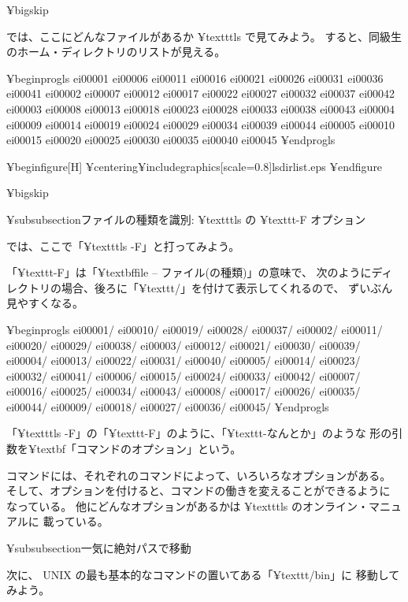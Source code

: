 {¥bigskip

では、ここにどんなファイルがあるか ¥texttt{ls} で見てみよう。
すると、同級生のホーム・ディレクトリのリストが見える。

¥begin{progls}
ei00001 ei00006 ei00011 ei00016 ei00021 ei00026 ei00031 ei00036 ei00041
ei00002 ei00007 ei00012 ei00017 ei00022 ei00027 ei00032 ei00037 ei00042
ei00003 ei00008 ei00013 ei00018 ei00023 ei00028 ei00033 ei00038 ei00043
ei00004 ei00009 ei00014 ei00019 ei00024 ei00029 ei00034 ei00039 ei00044
ei00005 ei00010 ei00015 ei00020 ei00025 ei00030 ei00035 ei00040 ei00045
%
¥end{progls}

¥begin{figure}[H]
¥centering{¥includegraphics[scale=0.8]{lsdirlist.eps}}
¥end{figure}

¥bigskip

¥subsubsection{ファイルの種類を識別: ¥texttt{ls} の ¥texttt{-F} オプション}

では、ここで「¥texttt{ls -F}」と打ってみよう。

「¥texttt{-F}」は「¥textbf{f}ile -- ファイル(の種類)」の意味で、
次のようにディレクトリの場合、後ろに「¥texttt{/}」を付けて表示してくれるので、
ずいぶん見やすくなる。

¥begin{progls}
ei00001/        ei00010/        ei00019/        ei00028/        ei00037/
ei00002/        ei00011/        ei00020/        ei00029/        ei00038/
ei00003/        ei00012/        ei00021/        ei00030/        ei00039/
ei00004/        ei00013/        ei00022/        ei00031/        ei00040/
ei00005/        ei00014/        ei00023/        ei00032/        ei00041/
ei00006/        ei00015/        ei00024/        ei00033/        ei00042/
ei00007/        ei00016/        ei00025/        ei00034/        ei00043/
ei00008/        ei00017/        ei00026/        ei00035/        ei00044/
ei00009/        ei00018/        ei00027/        ei00036/        ei00045/
%
¥end{progls}

「¥texttt{ls -F}」の「¥texttt{-F}」のように、「¥texttt{-なんとか}」のような
形の引数を¥textbf{「コマンドのオプション」}という。

コマンドには、それぞれのコマンドによって、いろいろなオプションがある。
そして、オプションを付けると、コマンドの働きを変えることができるように
なっている。
他にどんなオプションがあるかは ¥texttt{ls} のオンライン・マニュアルに
載っている。

¥subsubsection{一気に絶対パスで移動}

次に、 UNIX の最も基本的なコマンドの置いてある「¥texttt{/bin}」に
移動してみよう。

}
